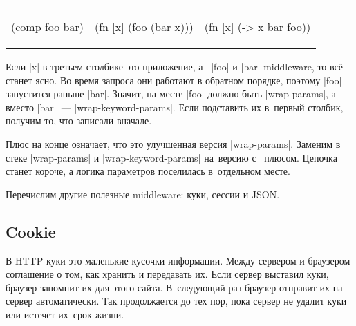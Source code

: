 \noindent
\begin{tabular}{ @{}p{3.2cm} @{}p{3.5cm} @{}p{3.5cm} }

\begin{english}
  \begin{clojure}
(comp foo bar)
  \end{clojure}
\end{english}

&

\begin{english}
  \begin{clojure}
(fn [x]
  (foo (bar x)))
  \end{clojure}
\end{english}

&

\begin{english}
  \begin{clojure}
(fn [x] (-> x
            bar
            foo))
  \end{clojure}
\end{english}

\end{tabular}

Если \spverb|x| в третьем столбике это приложение, а~ \spverb|foo| и
\spverb|bar| middleware, то вс\"{е} станет ясно. Во время запроса они работают в
обратном порядке, поэтому \spverb|foo| запустится раньше \spverb|bar|. Значит,
на месте \spverb|foo| должно быть \spverb|wrap-params|, а вместо
\spverb|bar|~--- \spverb|wrap-keyword-params|. Если подставить их в~первый
столбик, получим то, что записали вначале.

Плюс на конце означает, что это улучшенная версия \spverb|wrap-params|. Заменим
в стеке \spverb|wrap-params| и \spverb|wrap-keyword-params| на~версию с~
плюсом. Цепочка станет короче, а логика параметров поселилась в~отдельном месте.

Перечислим другие полезные middleware: куки, сессии и JSON.

\subsection{Cookie}

В HTTP куки это маленькие кусочки информации. Между сервером и браузером
соглашение о том, как хранить и передавать их. Если сервер выставил куки,
браузер запомнит их для этого сайта. В~следующий раз браузер отправит их на
сервер автоматически. Так продолжается до тех пор, пока сервер не удалит куки
или истечет их~срок жизни.

